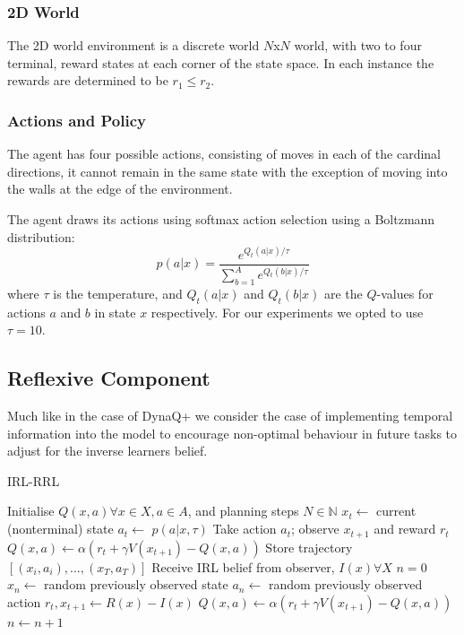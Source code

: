 \documentclass[10pt,technote]{IEEEtran}
\begin{document}
\subsubsection{2D World}

The 2D world environment is a discrete world $N$x$N$ world, with two to four terminal, reward states at each corner of the state space. In each instance the rewards are determined to be $r_1 \leq r_2$.

\subsubsection{Actions and Policy}

The agent has four possible actions, consisting of moves in each of the cardinal directions, it cannot remain in the same state with the exception of moving into the walls at the edge of the environment.

The agent draws its actions using softmax action selection using a Boltzmann distribution:
\begin{equation}
p(a|x) = \frac{e^{Q_t (a|x) / \tau}}{\sum^{A}_{b=1}e^{Q_t (b|x) / \tau}}
\end{equation}
where $\tau$ is the temperature, and $Q_t (a|x)$ and $Q_t (b|x)$ are the $Q$-values for actions $a$ and $b$ in state $x$ respectively. For our experiments we opted to use $\tau=10$.


\subsection{Reflexive Component}

Much like in the case of DynaQ+ we consider the case of implementing temporal information into the model to encourage non-optimal behaviour in future tasks to adjust for the inverse learners belief.

\begin{algorithm}
\caption{IRL-RRL}
\begin{algorithmic}[1]
\Require Initialise $Q(x,a) \forall x \in X, a \in A$, and planning steps $N \in \mathbb{N}$ 
\State $x_t \leftarrow$ current (nonterminal) state
\State $a_t \leftarrow$ $p(a|x, \tau)$
\State Take action $a_t$; observe $x_{t+1}$ and reward $r_t$
\State $Q(x,a) \leftarrow \alpha \left(r_t + \gamma V(x_{t+1}) -  Q(x,a) \right)$
\State Store trajectory $[(x_i, a_i), ..., (x_T, a_T)]$
\EndWhile
\State Receive IRL belief from observer, $I(x) \forall X$
\State $n=0$
\State $x_n \leftarrow$ random previously observed state
\State $a_n \leftarrow$ random previously observed action
\State $r_t, x_{t+1} \leftarrow R(x) - I(x)$
\State $Q(x,a) \leftarrow \alpha \left(r_t + \gamma V(x_{t+1}) -  Q(x,a) \right)$
\State $n \leftarrow n+1$
\EndWhile
\EndWhile
\end{algorithmic}
\label{alg:irlrrl}
\end{algorithm}
\end{document}
